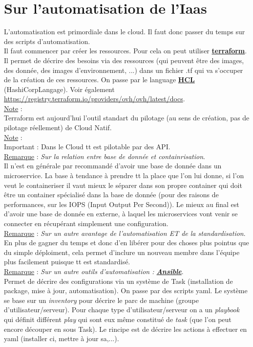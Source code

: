 \documentclass[a4paper,12pt,twoside]{article}
\newcommand{\urlcolor}{magenta}  %
\newcommand{\keycolor}{purple} %
\newcommand{\incode}[1]{{\footnotesize\ttfamily #1}} %
\newcommand{\rem}[2]{\noindent\underline{Remarque} : \textit{#1}.\\ \indent #2}
\newcommand{\note}[1]{\noindent\underline{Note} : \\ \indent #1}
\newcommand{\keyref}[2]{\hypersetup{urlcolor=\keycolor} \href{#1}{\textbf{#2}}\hypersetup{urlcolor=\urlcolor}}
\begin{document}
\section{Sur l'automatisation de l'Iaas}

L'automatisation est primordiale dans le cloud. Il faut donc passer du temps sur des scripts d'automatisation. \\

Il faut commencer par créer les ressources. Pour cela on peut utiliser \keyref{https://www.terraform.io/}{terraform}. Il permet de décrire des besoins via des ressources (qui peuvent être des images, des donnée, des images d'environnement, ...) dans un fichier \incode{.tf} qui va s'occuper de la création de ces ressources. On passe par le language \keyref{https://www.terraform.io/language/syntax/configuration}{HCL} (HashiCorpLangage). Voir également \url{https://registry.terraform.io/providers/ovh/ovh/latest/docs}.\\

\note{Terraform est aujourd'hui l'outil standart du pilotage (au sens de création, pas de pilotage réellement) de Cloud Natif.}\\

\note{Important : Dans le Cloud tt est pilotable par des API.}\\

\rem{Sur la relation entre base de donnée et containrisation}{Il n'est en générale par recommandé d'avoir une base de donnée dans un microservice. La base à tendance à prendre tt la place que l'on lui donne, si l'on veut le containeriser il vaut mieux le séparer dans son propre container qui doit être un container spécialisé dans la base de donnée (pour des raisons de performances, sur les IOPS (Input Output Per Second)). Le mieux au final est d'avoir une base de donnée en externe, à laquel les microservices vont venir se connecter en récupérant simplement une configuration.}\\

\rem{Sur un autre avantage de l'automatisation ET de la standardisation}{En plus de gagner du temps et donc d'en libérer pour des choses plus pointus que du simple déploiment, cela permet d'inclure un nouveau membre dans l'équipe plus facilement puisque tt est standardisé.}\\

\rem{Sur un autre outils d'automatisation : \keyref{https://docs.ansible.com/ansible/latest/index.html}{Ansible}}{Permet de décrire des configurations via un système de Task (installation de package, mise à jour, automatisation). On passe par des scripts \incode{yaml}. Le système se base sur un \textit{inventory} pour décrire le parc de machine (groupe d'utilisateur/serveur). Pour chaque type d'utilisateur/serveur on a un \textit{playbook} qui définit différent \textit{play} qui sont eux même constitué de \textit{task} (que l'on peut encore découper en sous Task). Le rincipe est de décrire les actions à effectuer en yaml (installer ci, mettre à jour sa,...).}\\
\end{document}
